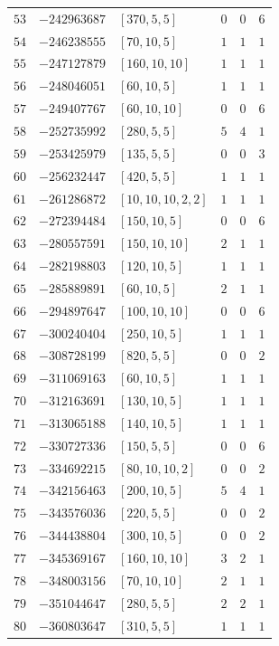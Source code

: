 \documentclass[11pt]{article}
\begin{document}
\begin{center}
\begin{longtable}{r r l c c c}
$53$ & $-242963687$ & $[370,5,5]$ & $0$ & $0$ & $6$\\
$54$ & $-246238555$ & $[70,10,5]$ & $1$ & $1$ & $1$\\
$55$ & $-247127879$ & $[160,10,10]$ & $1$ & $1$ & $1$\\
$56$ & $-248046051$ & $[60,10,5]$ & $1$ & $1$ & $1$\\
$57$ & $-249407767$ & $[60,10,10]$ & $0$ & $0$ & $6$\\
$58$ & $-252735992$ & $[280,5,5]$ & $5$ & $4$ & $1$\\
$59$ & $-253425979$ & $[135,5,5]$ & $0$ & $0$ & $3$\\
$60$ & $-256232447$ & $[420,5,5]$ & $1$ & $1$ & $1$\\
$61$ & $-261286872$ & $[10,10,10,2,2]$ & $1$ & $1$ & $1$\\
$62$ & $-272394484$ & $[150,10,5]$ & $0$ & $0$ & $6$\\
$63$ & $-280557591$ & $[150,10,10]$ & $2$ & $1$ & $1$\\
$64$ & $-282198803$ & $[120,10,5]$ & $1$ & $1$ & $1$\\
$65$ & $-285889891$ & $[60,10,5]$ & $2$ & $1$ & $1$\\
$66$ & $-294897647$ & $[100,10,10]$ & $0$ & $0$ & $6$\\
$67$ & $-300240404$ & $[250,10,5]$ & $1$ & $1$ & $1$\\
$68$ & $-308728199$ & $[820,5,5]$ & $0$ & $0$ & $2$\\
$69$ & $-311069163$ & $[60,10,5]$ & $1$ & $1$ & $1$\\
$70$ & $-312163691$ & $[130,10,5]$ & $1$ & $1$ & $1$\\
$71$ & $-313065188$ & $[140,10,5]$ & $1$ & $1$ & $1$\\
$72$ & $-330727336$ & $[150,5,5]$ & $0$ & $0$ & $6$\\
$73$ & $-334692215$ & $[80,10,10,2]$ & $0$ & $0$ & $2$\\
$74$ & $-342156463$ & $[200,10,5]$ & $5$ & $4$ & $1$\\
$75$ & $-343576036$ & $[220,5,5]$ & $0$ & $0$ & $2$\\
$76$ & $-344438804$ & $[300,10,5]$ & $0$ & $0$ & $2$\\
$77$ & $-345369167$ & $[160,10,10]$ & $3$ & $2$ & $1$\\
$78$ & $-348003156$ & $[70,10,10]$ & $2$ & $1$ & $1$\\
$79$ & $-351044647$ & $[280,5,5]$ & $2$ & $2$ & $1$\\
$80$ & $-360803647$ & $[310,5,5]$ & $1$ & $1$ & $1$\\

\end{longtable}
\end{center}
\end{document}
